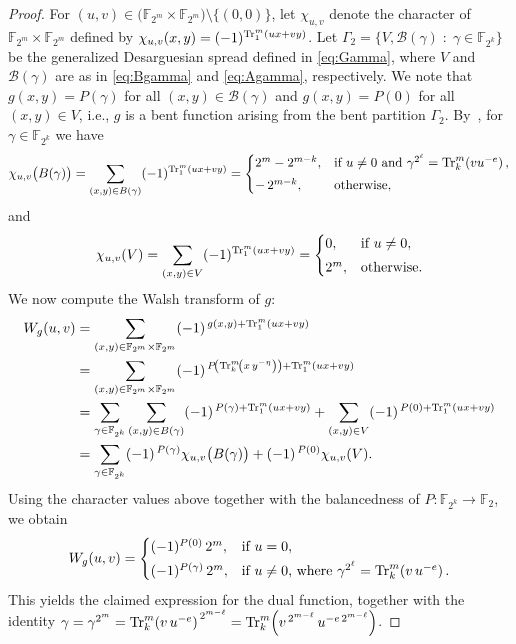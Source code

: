 \documentclass[12pt]{article}
\theoremstyle{plain}
\theoremstyle{definition}
\newcommand{\F}{\mathbb{F}}
\renewcommand{\to}{\rightarrow}
\newcommand{\Tr}{{\rm Tr}}
\begin{document}
	\begin{proof}
		For \((u,v) \in \bigl(\mathbb{F}_{2^{m}} \times \mathbb{F}_{2^{m}}\bigr)
		\setminus \{(0,0)\}\), let \(\chi_{u,v}\) denote the character of
		\(\mathbb{F}_{2^{m}} \times \mathbb{F}_{2^{m}}\) defined by
		$\chi_{u,v}(x,y)
		=
		(-1)^{\Tr_1^{m}(ux + vy)}$.
		Let $\Gamma_2 = \{V, \mathcal{B}(\gamma)\; : \; \gamma\in\F_{2^k}\}$ 
		be the generalized Desarguesian spread defined in \eqref{eq:Gamma}, where \(V\) and
		\(\mathcal{B}(\gamma)\)  are as in \eqref{eq:Bgamma} and \eqref{eq:Agamma}, respectively.
		We note that \(g(x,y)=P(\gamma)\) for all \((x,y)\in \mathcal{B}(\gamma)\) and
		\(g(x,y)=P(0)\) for all \((x,y)\in V\), i.e., \(g\) is a bent function arising from the bent partition
		\(\Gamma_2\).
		By~\cite[Proposition~10]{akm24}, for \(\gamma \in \mathbb{F}_{2^{k}}\) we have
		\[
		\chi_{u,v}\bigl(B(\gamma)\bigr)
		=\sum_{(x,y)\in B(\gamma)}(-1)^{\Tr_1^{m}(ux + vy)}=
		\begin{cases}
		2^{m} - 2^{m-k}, &
		\text{if } u \neq 0 \text{ and }
		\gamma^{2^\ell} = \Tr_k^{m}\!\left(vu^{-e}\right), \\[1mm]
		-\,2^{m-k}, & \text{otherwise},
		\end{cases}
		\] 
		and
		\[
		\chi_{u,v}(V)
		=\sum_{(x,y)\in V}(-1)^{\Tr_1^{m}(ux + vy)}
		=
		\begin{cases}
		0, & \text{if } u \neq 0, \\[1mm]
		2^{m}, & \text{otherwise}.
		\end{cases}
		\]
		We now compute the Walsh transform of \(g\):
		\begin{align*}
			W_g(u,v)
			&=
			\sum_{(x,y) \in \mathbb{F}_{2^{m}} \times \mathbb{F}_{2^{m}}}
			(-1)^{\,g(x,y) + \Tr_1^{m}(ux+vy)} \\
			&=
			\sum_{(x,y) \in \mathbb{F}_{2^{m}} \times \mathbb{F}_{2^{m}}}
			(-1)^{\,P\!\left(\Tr_{k}^{m}\!\left(x\,y^{-\eta }\right)\right)
				+ \Tr_1^{m}(ux+vy)} \\
			&=
			\sum_{\gamma \in \mathbb{F}_{2^{k}}}
			\sum_{(x,y) \in B(\gamma)}
			(-1)^{\,P(\gamma) + \Tr_1^{m}(ux+vy)}
			+
			\sum_{(x,y) \in V}
			(-1)^{\,P(0) + \Tr_1^{m}(ux+vy)} \\
			&=
			\sum_{\gamma \in \mathbb{F}_{2^{k}}}
			(-1)^{\,P(\gamma)} \chi_{u,v}\bigl(B(\gamma)\bigr)
			+
			(-1)^{\,P(0)} \chi_{u,v}(V).
		\end{align*}
		Using the character values above together with the balancedness of
		\(P \colon \mathbb{F}_{2^{k}} \to \mathbb{F}_2\), we obtain
		\[
		W_g(u,v)
		=
		\begin{cases}
		(-1)^{P(0)}\,2^{m}, & \text{if } u = 0, \\[1mm]
		(-1)^{P(\gamma)}\,2^{m},
		& \text{if } u \neq 0 \text{, where }
		\gamma^{2^\ell} = \Tr_k^{m}\!\left(v\,u^{-e}\right).
		\end{cases}
		\]
		This yields the claimed expression for the dual function, together with the identity $\gamma = \gamma^{2^m}
		= \Tr_k^{m}\!\left(v\,u^{-e}\right)^{\,2^{m-\ell}}
		=\Tr_k^{m}\!\left(v^{\,2^{m-\ell}}\,u^{-e{\,2^{m-\ell}}}\right)$.
	\end{proof}
	
\end{document}
